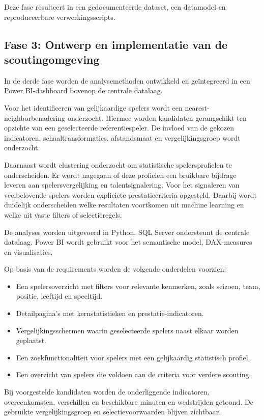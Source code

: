 Deze fase resulteert in een gedocumenteerde dataset, een datamodel en reproduceerbare verwerkingsscripts.

\subsection{Fase 3: Ontwerp en implementatie van de scoutingomgeving}

In de derde fase worden de analysemethoden ontwikkeld en geïntegreerd in een Power BI-dashboard bovenop de centrale datalaag.

Voor het identificeren van gelijkaardige spelers wordt een nearest-neighborbenadering onderzocht. Hiermee worden kandidaten gerangschikt ten opzichte van een geselecteerde referentiespeler. De invloed van de gekozen indicatoren, schaaltransformaties, afstandsmaat en vergelijkingsgroep wordt onderzocht.

Daarnaast wordt clustering onderzocht om statistische spelersprofielen te onderscheiden. Er wordt nagegaan of deze profielen een bruikbare bijdrage leveren aan spelersvergelijking en talentsignalering. Voor het signaleren van veelbelovende spelers worden expliciete prestatiecriteria opgesteld. Daarbij wordt duidelijk onderscheiden welke resultaten voortkomen uit machine learning en welke uit vaste filters of selectieregels.

De analyses worden uitgevoerd in Python. SQL Server ondersteunt de centrale datalaag. Power BI wordt gebruikt voor het semantische model, DAX-measures en visualisaties.

Op basis van de requirements worden de volgende onderdelen voorzien:
\begin{itemize}
  \item Een spelersoverzicht met filters voor relevante kenmerken, zoals seizoen, team, positie, leeftijd en speeltijd.
  \item Detailpagina's met kernstatistieken en prestatie-indicatoren.
  \item Vergelijkingsschermen waarin geselecteerde spelers naast elkaar worden geplaatst.
  \item Een zoekfunctionaliteit voor spelers met een gelijkaardig statistisch profiel.
  \item Een overzicht van spelers die voldoen aan de criteria voor verdere scouting.
\end{itemize}

Bij voorgestelde kandidaten worden de onderliggende indicatoren, overeenkomsten, verschillen en beschikbare minuten en wedstrijden getoond. De gebruikte vergelijkingsgroep en selectievoorwaarden blijven zichtbaar.

